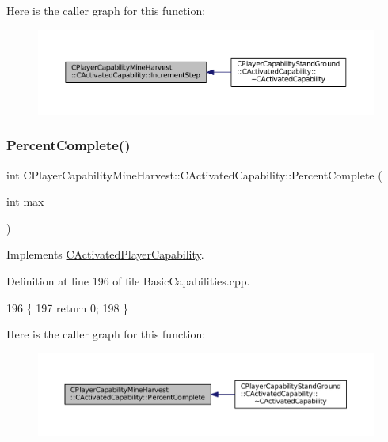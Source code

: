 Here is the caller graph for this function\+:\nopagebreak
\begin{figure}[H]
\begin{center}
\leavevmode
\includegraphics[width=350pt]{classCPlayerCapabilityMineHarvest_1_1CActivatedCapability_a46dbd6e2ae2fb889da1714c97ed3ca2f_icgraph}
\end{center}
\end{figure}
\hypertarget{classCPlayerCapabilityMineHarvest_1_1CActivatedCapability_ac198166a008306dc543ceed94baaf4a3}{}\label{classCPlayerCapabilityMineHarvest_1_1CActivatedCapability_ac198166a008306dc543ceed94baaf4a3} 
\subsubsection{\texorpdfstring{Percent\+Complete()}{PercentComplete()}}
{\footnotesize\ttfamily int C\+Player\+Capability\+Mine\+Harvest\+::\+C\+Activated\+Capability\+::\+Percent\+Complete (\begin{DoxyParamCaption}\item[{int}]{max }\end{DoxyParamCaption})\hspace{0.3cm}{\ttfamily [virtual]}}



Implements \hyperlink{classCActivatedPlayerCapability_a405dc6076058006a4f801727de4cfe4d}{C\+Activated\+Player\+Capability}.



Definition at line 196 of file Basic\+Capabilities.\+cpp.


\begin{DoxyCode}
196                                                                             \{
197     \textcolor{keywordflow}{return} 0;
198 \}
\end{DoxyCode}
Here is the caller graph for this function\+:\nopagebreak
\begin{figure}[H]
\begin{center}
\leavevmode
\includegraphics[width=350pt]{classCPlayerCapabilityMineHarvest_1_1CActivatedCapability_ac198166a008306dc543ceed94baaf4a3_icgraph}
\end{center}
\end{figure}


